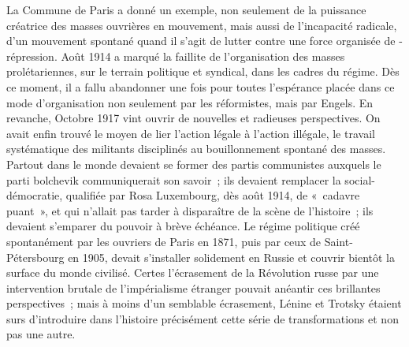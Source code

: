 \documentclass[french,twoside]{book} %
\begin{document}
La Commune de Paris a donné un exemple, non seulement de la puissance créatrice des masses ouvrières en mouvement, mais aussi de l'incapacité radicale, d'un mouvement spontané quand il s'agit de lutter contre une force organisée de -répression. Août 1914 a marqué la faillite de l'organisation des masses prolétariennes, sur le terrain politique et syndical, dans les cadres du régime. Dès ce moment, il a fallu abandonner une fois pour toutes l'espérance placée dans ce mode d'organisation non seulement par les réformistes, mais par Engels. En revanche, Octobre 1917 vint ouvrir de nouvelles et radieuses perspectives. On avait enfin trouvé le moyen de lier l'action légale à l'action illégale, le travail systématique des militants disciplinés au bouillonnement spontané des masses. Partout dans le monde devaient se former des partis communistes auxquels le parti bolchevik communiquerait son savoir ; ils devaient remplacer la social-démocratie, qualifiée par Rosa Luxembourg, dès août 1914, de « cadavre puant », et qui n'allait pas tarder à disparaître de la scène de l'histoire ; ils devaient s'emparer du pouvoir à brève échéance. Le régime politique créé spontanément par les ouvriers de Paris en 1871, puis par ceux de Saint-Pétersbourg en 1905, devait s'installer solidement en Russie et couvrir bientôt la surface du monde civilisé. Certes l'écrasement de la Révolution russe par une intervention brutale de l'impérialisme étranger pouvait anéantir ces brillantes perspectives ; mais à moins d'un semblable écrasement, Lénine et Trotsky étaient surs d'introduire dans l'histoire précisément cette série de transformations et non pas une autre.\par
\end{document}
